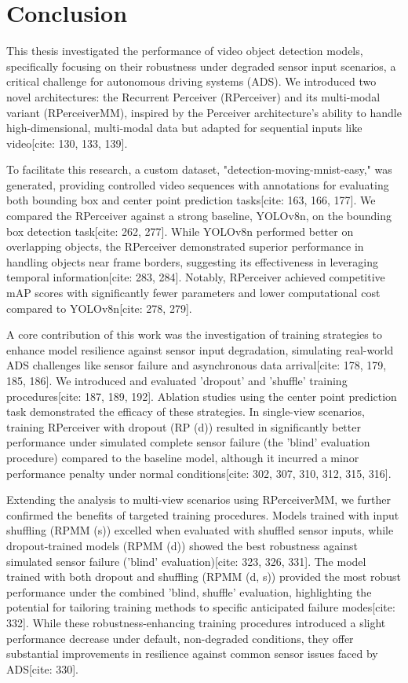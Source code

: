 \section{Conclusion} \label{Conclusion}
This thesis investigated the performance of video object detection models, specifically focusing on their robustness under degraded sensor input scenarios, a critical challenge for autonomous driving systems (ADS). We introduced two novel architectures: the Recurrent Perceiver (RPerceiver) and its multi-modal variant (RPerceiverMM), inspired by the Perceiver architecture's ability to handle high-dimensional, multi-modal data but adapted for sequential inputs like video[cite: 130, 133, 139].

To facilitate this research, a custom dataset, "detection-moving-mnist-easy," was generated, providing controlled video sequences with annotations for evaluating both bounding box and center point prediction tasks[cite: 163, 166, 177]. We compared the RPerceiver against a strong baseline, YOLOv8n, on the bounding box detection task[cite: 262, 277]. While YOLOv8n performed better on overlapping objects, the RPerceiver demonstrated superior performance in handling objects near frame borders, suggesting its effectiveness in leveraging temporal information[cite: 283, 284]. Notably, RPerceiver achieved competitive mAP scores with significantly fewer parameters and lower computational cost compared to YOLOv8n[cite: 278, 279].

A core contribution of this work was the investigation of training strategies to enhance model resilience against sensor input degradation, simulating real-world ADS challenges like sensor failure and asynchronous data arrival[cite: 178, 179, 185, 186]. We introduced and evaluated 'dropout' and 'shuffle' training procedures[cite: 187, 189, 192]. Ablation studies using the center point prediction task demonstrated the efficacy of these strategies. In single-view scenarios, training RPerceiver with dropout (RP (d)) resulted in significantly better performance under simulated complete sensor failure (the 'blind' evaluation procedure) compared to the baseline model, although it incurred a minor performance penalty under normal conditions[cite: 302, 307, 310, 312, 315, 316].

Extending the analysis to multi-view scenarios using RPerceiverMM, we further confirmed the benefits of targeted training procedures. Models trained with input shuffling (RPMM (s)) excelled when evaluated with shuffled sensor inputs, while dropout-trained models (RPMM (d)) showed the best robustness against simulated sensor failure ('blind' evaluation)[cite: 323, 326, 331]. The model trained with both dropout and shuffling (RPMM (d, s)) provided the most robust performance under the combined 'blind, shuffle' evaluation, highlighting the potential for tailoring training methods to specific anticipated failure modes[cite: 332]. While these robustness-enhancing training procedures introduced a slight performance decrease under default, non-degraded conditions, they offer substantial improvements in resilience against common sensor issues faced by ADS[cite: 330].

